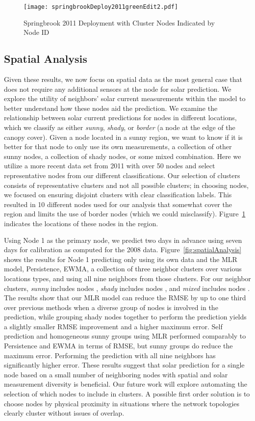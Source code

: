 \documentclass[prodmode,acmtosn]{acmsmall}
\begin{document}
\begin{figure}[htb]
\centering
\texttt{[image: springbrookDeploy2011greenEdit2.pdf]}
\caption{Springbrook 2011 Deployment with Cluster Nodes Indicated by Node ID}
\label{fig:deploymentSite}
\end{figure}

\subsection{Spatial Analysis}
Given these results,  we now focus on spatial data as the most general case that does not require any additional sensors at the node for solar prediction. We explore the utility of neighbors' solar current measurements within the model to better understand how these nodes aid the prediction.
We examine the relationship between solar current predictions for nodes in different locations, which we classify as either {\it sunny}, {\it shady}, or {\it border} (a node at the edge of the canopy cover).
Given a node located in a sunny region, we want to know if it is better for that node to only use its own measurements, a collection of other sunny nodes, a collection of shady nodes, or some  mixed combination.
Here we utilize a more recent data set from 2011 with over 50 nodes and select representative nodes from our different classifications.
Our selection of clusters consists of representative clusters and not all possible clusters; in choosing nodes, we focused on ensuring disjoint clusters with clear classification labels.
This resulted in 10 different nodes used for our analysis that somewhat cover the region and limits the use of border nodes (which we could misclassify).
Figure~\ref{fig:deploymentSite} indicates the locations of these nodes in the region.

Using Node 1 as the primary node, we predict two days in advance using seven days for calibration as computed for the 2008 data.
Figure~\ref{fig:spatialAnalysis} shows the results for Node 1 predicting only using its own data and the MLR model, Persistence, EWMA, a collection of three neighbor clusters over various locations types, and using all nine neighbors from those clusters.
For our neighbor clusters, {\it sunny} includes nodes , {\it shady} includes nodes , and {\it mixed} includes nodes .
 The results show that our MLR model can reduce the RMSE by up to one third over previous methods when a diverse group of nodes is involved in the prediction, while grouping shady nodes
 together to perform the prediction yields  a slightly smaller RMSE improvement and a higher maximum error. Self prediction and homogeneous sunny groups using MLR performed comparably to Persistence and EWMA in terms of RMSE, but sunny groups do reduce the maximum error.    Performing the prediction with all nine neighbors  has significantly higher  error. These results suggest that solar prediction  for a single node based on a small number of  neighboring nodes with spatial and solar measurement diversity is beneficial.
Our future work will explore automating the selection of which nodes to include in clusters.
A possible first order solution is to choose nodes by physical proximity in situations where the network topologies clearly cluster without issues of overlap.
 
\end{document}
